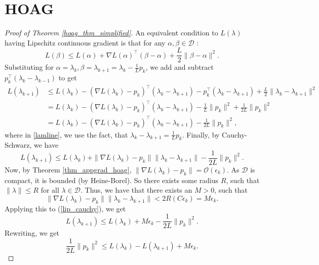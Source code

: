 \documentclass[11pt, twoside]{report}
\begin{document}
\section{HOAG}
\begin{proof}[Proof of Theorem \ref{hoag_thm_simplified}]
An equivalent condition to $L(\lambda)$ having Lipschitz continuous gradient is that for any $\alpha,\beta \in \mathcal{D}$ \cite{Zhou2018}:
\begin{equation} \label{lipschitz_equiv2}
    L(\beta) \leq L(\alpha) + \nabla L(\alpha)^\top (\beta - \alpha) + \frac{L}{2}\|\beta - \alpha\|^2.
\end{equation}
Substituting for $\alpha = \lambda_k, \beta = \lambda_{k+1} = \lambda_k - \frac{1}{L}p_k$, we add and subtract $p_k^\top(\lambda_k - \lambda_{k-1})$ to get
\begin{align}
    L(\lambda_{k+1}) &\leq L(\lambda_k) - (\nabla L(\lambda_k) -p_k)^\top(\lambda_k - \lambda_{k+1}) -p_k^\top(\lambda_k - \lambda_{k+1})+\frac{L}{2}\|\lambda_k - \lambda_{k+1}\|^2 \\
    &= L(\lambda_k) - (\nabla L(\lambda_k) -p_k)^\top(\lambda_k - \lambda_{k+1}) -\frac{1}{L}\|p_k\|^2+\frac{1}{2L}\|p_k\|^2 \quad  \label{lamline} \\
    &=L(\lambda_k) - (\nabla L(\lambda_k) -p_k)^\top(\lambda_k - \lambda_{k+1}) -\frac{1}{2L}\|p_k\|^2,
\end{align}
where in \eqref{lamline}, we use the fact, that $\lambda_{k}-\lambda_{k+1} = \frac{1}{L}p_k$. Finally, by Cauchy-Schwarz, we have
\begin{equation} \label{lip_cauchy}
    L(\lambda_{k+1}) \leq L(\lambda_k) + \|\nabla L(\lambda_k) -p_k\|\|\lambda_k - \lambda_{k+1}\| -\frac{1}{2L}\|p_k\|^2.
\end{equation}
Now, by Theorem \ref{thm_appgrad_hoag}, $\|\nabla L(\lambda_k) -p_k\| = \mathcal{O}(\epsilon_k)$. As $\mathcal{D}$ is compact, it is bounded (by Heine-Borel). So there exists some radius $R$, such that $\|\lambda\| \leq R$ for all $\lambda \in \mathcal{D}$. Thus, we have that there exists an $M>0$, such that
\[\|\nabla L(\lambda_k) -p_k\|\|\lambda_k - \lambda_{k+1}\| < 2R(C \epsilon_k) = M\epsilon_k.\]
Applying this to (\ref{lip_cauchy}), we get
\begin{equation} \label{lip_cauchy_2}
    L(\lambda_{k+1}) \leq L(\lambda_k) + M\epsilon_k -\frac{1}{2L}\|p_k\|^2.
\end{equation}
Rewriting, we get
\begin{equation} \label{lam_bound}
    \frac{1}{2L}\|p_k\|^2 \leq L(\lambda_k) - L(\lambda_{k+1}) + M\epsilon_k.

\end{equation}
\end{proof}
\end{document}
